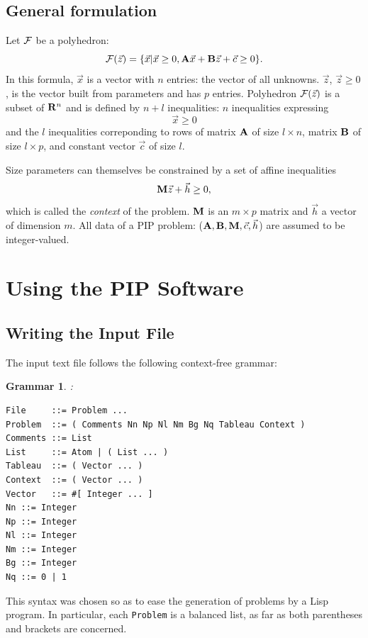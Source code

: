 \documentclass[12pt,a4paper]{article}
\newtheorem{grammar}{Grammar}
\begin{document}
\subsection{General formulation}
Let ${\cal F}$ be a polyhedron:
\begin{equation}
 \label{polyedre}
{\cal F}(\vec{z})
 = \{ \vec{x} | \vec{x} \geq 0,
			{\bf A} \vec{x} + {\bf B} \vec{z} + \vec{c} \geq 0\} .
\end{equation}
In this formula, $\vec{x}$ is a vector with $n$ entries: the vector of
all unknowns. $\vec{z}$, $\vec{z}\geq 0$, is the vector built from
parameters and has $p$ entries. Polyhedron ${\cal F}(\vec{z})$ is a
subset of ${\bf R}^{n}$ and is defined by $n + l$ inequalities: $n$
inequalities expressing
\[ \vec{x} \geq 0 \]
and the $l$ inequalities correponding to rows of matrix
${\bf A}$ of size $l \times n$, matrix ${\bf B}$ of size $l \times p$,
and constant vector $\vec{c}$ of size $l$.

Size parameters can themselves be constrained by a set of affine inequalities
\[ {\bf M} \vec{z} + \vec{h} \geq 0 ,\]
which is called the {\em context} of the problem. ${\bf M}$ is an $m
\times p$ matrix and $\vec{h}$ a vector of dimension $m$.
All data of a PIP problem: (${\bf A}, {\bf B}, {\bf M}, \vec{c}, \vec{h}$)
 are assumed to be integer-valued. 


\section{Using the PIP Software}
\label{PIP}

\subsection{Writing the Input File}
\label{specif:donnees}

The input text file follows the following context-free grammar:
\begin{grammar}
:
\label{probleme}
\begin{verbatim}
File     ::= Problem ...
Problem  ::= ( Comments Nn Np Nl Nm Bg Nq Tableau Context )
Comments ::= List
List     ::= Atom | ( List ... )
Tableau  ::= ( Vector ... )
Context  ::= ( Vector ... )
Vector   ::= #[ Integer ... ]
Nn ::= Integer
Np ::= Integer
Nl ::= Integer
Nm ::= Integer
Bg ::= Integer
Nq ::= 0 | 1
\end{verbatim}
\end{grammar}
This syntax was chosen so as to ease the generation of problems
 by a Lisp program. In
particular, each {\tt Problem} is a balanced list, as far as both
parentheses and brackets are concerned.
\end{document}
